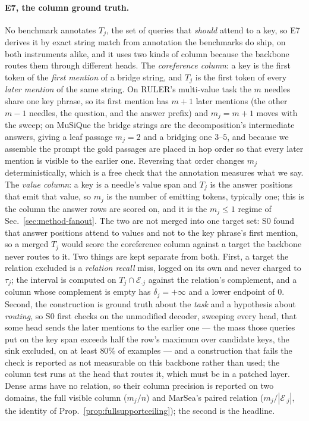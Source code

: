 \documentclass{article}
\begin{document}
\paragraph{E7, the column ground truth.} No benchmark annotates $T_j$, the set of queries that
\emph{should} attend to a key, so E7 derives it by exact string match from annotation the
benchmarks do ship, on both instruments alike, and it uses two kinds of column because the
backbone routes them through different heads. The \emph{coreference column}: a key is the first
token of the \emph{first mention} of a bridge string, and $T_j$ is the first token of every
\emph{later mention} of the same string. On RULER's multi-value task the $m$ needles share one
key phrase, so its first mention has $m+1$ later mentions (the other $m-1$ needles, the
question, and the answer prefix) and $m_j=m+1$ moves with the sweep; on MuSiQue the bridge
strings are the decomposition's intermediate answers, giving a leaf passage $m_j=2$ and a
bridging one $3$--$5$, and because we assemble the prompt the gold passages are placed in hop
order so that every later mention is visible to the earlier one. Reversing that order changes
$m_j$ deterministically, which is a free check that the annotation measures what we say. The
\emph{value column}: a key is a needle's value span and $T_j$ is the answer positions that emit
that value, so $m_j$ is the number of emitting tokens, typically one; this is the column the
answer rows are scored on, and it is the $m_j\le1$ regime of Sec.~\ref{sec:method-fanout}. The
two are not merged into one target set: S0 found that answer positions attend to values and not
to the key phrase's first mention, so a merged $T_j$ would score the coreference column against
a target the backbone never routes to it. Two things are kept separate from both. First, a
target the relation excluded is a \emph{relation recall} miss, logged on its own and never
charged to $\tau_j$; the interval is computed on $T_j\cap\mathcal{E}_{\cdot j}$ against the
relation's complement, and a column whose complement is empty has $\delta_j=+\infty$ and a lower
endpoint of $0$. Second, the construction is ground truth about the \emph{task} and a hypothesis
about \emph{routing}, so S0 first checks on the unmodified decoder, sweeping every head, that
some head sends the later mentions to the earlier one --- the mass those queries put on the key
span exceeds half the row's maximum over candidate keys, the sink excluded, on at least $80\%$
of examples --- and a construction that fails the check is reported as not measurable on this
backbone rather than used; the column test runs at the head that routes it, which must be in a
patched layer. Dense arms have no relation, so their column precision is reported on
two domains, the full visible column ($m_j/n$) and MarSea's paired relation
($m_j/|\mathcal{E}_{\cdot j}|$, the identity of Prop.~\ref{prop:fullsupportceiling}); the second
is the headline.
\end{document}
